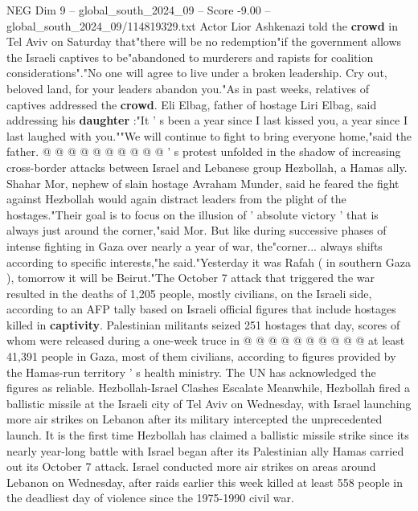 \begin{textsample}{NEG Dim 9 – global\_south\_2024\_09 – Score -9.00 – global\_south\_2024\_09/114819329.txt}
Actor Lior Ashkenazi told the \textbf{crowd} in Tel Aviv on Saturday that"there will be no redemption"if the government allows the Israeli captives to be"abandoned to murderers and rapists for coalition considerations"."No one will agree to live under a broken leadership.
Cry out, beloved land, for your leaders abandon you."As in past weeks, relatives of captives addressed the \textbf{crowd}.
Eli Elbag, father of hostage Liri Elbag, said addressing his \textbf{daughter} :"It ' s been a year since I last kissed you, a year since I last laughed with you.""We will continue to fight to bring everyone home,"said the father. @ @ @ @ @ @ @ @ @ @ ' s protest unfolded in the shadow of increasing cross-border attacks between Israel and Lebanese group Hezbollah, a Hamas ally.
Shahar Mor, nephew of slain hostage Avraham Munder, said he feared the fight against Hezbollah would again distract leaders from the plight of the hostages."Their goal is to focus on the illusion of ' absolute victory ' that is always just around the corner,"said Mor.
But like during successive phases of intense fighting in Gaza over nearly a year of war, the"corner... always shifts according to specific interests,"he said."Yesterday it was Rafah ( in southern Gaza ), tomorrow it will be Beirut."The October 7 attack that triggered the war resulted in the deaths of 1,205 people, mostly civilians, on the Israeli side, according to an AFP tally based on Israeli official figures that include hostages killed in \textbf{captivity}.
Palestinian militants seized 251 hostages that day, scores of whom were released during a one-week truce in @ @ @ @ @ @ @ @ @ @ at least 41,391 people in Gaza, most of them civilians, according to figures provided by the Hamas-run territory ' s health ministry.
The UN has acknowledged the figures as reliable.
Hezbollah-Israel Clashes Escalate Meanwhile, Hezbollah fired a ballistic missile at the Israeli city of Tel Aviv on Wednesday, with Israel launching more air strikes on Lebanon after its military intercepted the unprecedented launch.
It is the first time Hezbollah has claimed a ballistic missile strike since its nearly year-long battle with Israel began after its Palestinian ally Hamas carried out its October 7 attack.
Israel conducted more air strikes on areas around Lebanon on Wednesday, after raids earlier this week killed at least 558 people in the deadliest day of violence since the 1975-1990 civil war.

\end{textsample}
